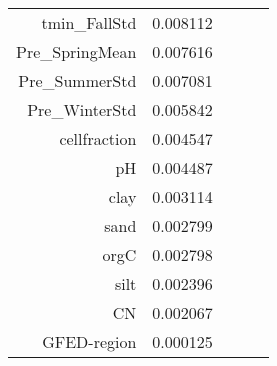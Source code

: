 \begin{tabular}{rrrrr}
tmin_FallStd & 0.008112 \\
Pre_SpringMean & 0.007616 \\
Pre_SummerStd & 0.007081 \\
Pre_WinterStd & 0.005842 \\
cellfraction & 0.004547 \\
pH & 0.004487 \\
clay & 0.003114 \\
sand & 0.002799 \\
orgC & 0.002798 \\
silt & 0.002396 \\
CN & 0.002067 \\
GFED-region & 0.000125 \\
\bottomrule
\end{tabular}
